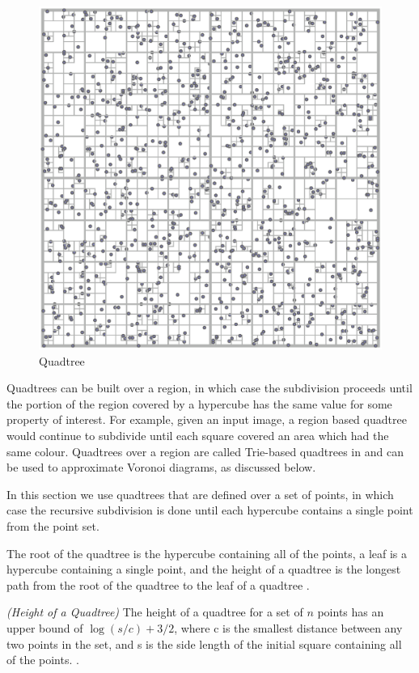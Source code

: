 \documentclass[mcs]{scsthesis}
\begin{document}
\begin{figure}
\begin{center}
\includegraphics[scale=0.35]{diagrams/quadtree.eps}
\caption{Quadtree}
\end{center}
\end{figure}

Quadtrees can be built over a region, in which case the subdivision proceeds
until the portion of the region covered by a hypercube has the same value for
some property of interest. For example, given an input image, a region based
quadtree would continue to subdivide until each square covered an area which
had the same colour. Quadtrees over a region are called Trie-based quadtrees in
\cite{samet} and can be used to approximate Voronoi diagrams, as discussed
below.

In this section we use quadtrees that are defined over a set of points, in which
case the recursive subdivision is done until each hypercube contains a single
point from the point set.

The root of the quadtree is the hypercube containing all of the points, a leaf
is a hypercube containing a single point, and the height of a quadtree
is the longest path from the root of the quadtree to the leaf of a quadtree
\cite{dutch}.

\begin{thm} \emph{(Height of a Quadtree)}
The height of a quadtree for a set of $n$ points has an upper bound of \(\log(s/c)
+ 3/2\), where c is the smallest distance between any two points in the set, and
s is the side length of the initial square containing all of the points.
\cite{dutch}.
\end{thm}
\end{document}
